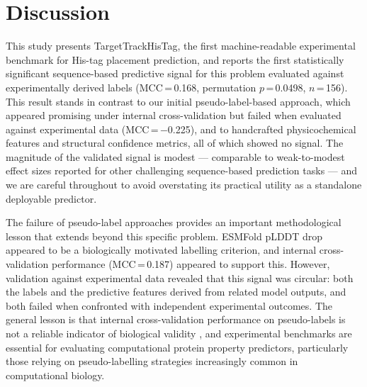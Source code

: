\documentclass[unnumsec,webpdf,contemporary,large]{oup-authoring-template}
\begin{document}
\section{Discussion}

This study presents TargetTrackHisTag, the first machine-readable experimental benchmark for His-tag placement prediction, and reports the first statistically significant sequence-based predictive signal for this problem evaluated against experimentally derived labels (MCC\,=\,0.168, permutation $p$\,=\,0.0498, $n$\,=\,156). This result stands in contrast to our initial pseudo-label-based approach, which appeared promising under internal cross-validation but failed when evaluated against experimental data (MCC\,=\,$-$0.225), and to handcrafted physicochemical features and structural confidence metrics, all of which showed no signal. The magnitude of the validated signal is modest --- comparable to weak-to-modest effect sizes reported for other challenging sequence-based prediction tasks --- and we are careful throughout to avoid overstating its practical utility as a standalone deployable predictor.

The failure of pseudo-label approaches provides an important methodological lesson that extends beyond this specific problem. ESMFold pLDDT drop appeared to be a biologically motivated labelling criterion, and internal cross-validation performance (MCC\,=\,0.187) appeared to support this. However, validation against experimental data revealed that this signal was circular: both the labels and the predictive features derived from related model outputs, and both failed when confronted with independent experimental outcomes. The general lesson is that internal cross-validation performance on pseudo-labels is not a reliable indicator of biological validity \citep{natarajan2013}, and experimental benchmarks are essential for evaluating computational protein property predictors, particularly those relying on pseudo-labelling strategies increasingly common in computational biology.
\end{document}
